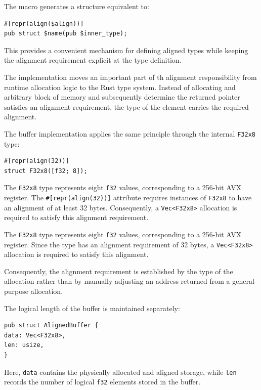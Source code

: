 The macro generates a structure equivalent to:

\begin{lstlisting}[style=rustblock]
#[repr(align($align))]
pub struct $name(pub $inner_type);
\end{lstlisting}

This provides a convenient mechanism for defining aligned types while keeping the alignment requirement 
explicit at the type definition.

The implementation moves an important part of th alignment responsibility from runtime allocation logic to 
the Rust type system.
Instead of allocating and arbitrary block of memory and subsequently determine the returned pointer satisfies an 
alignment requirement, the type of the element carries the required alignment.

The buffer implementation applies the same principle through the internal \lstinline|F32x8| type:

\begin{lstlisting}[style=rustblock]
#[repr(align(32))]
struct F32x8([f32; 8]);
\end{lstlisting}

The \lstinline|F32x8| type represents eight \lstinline|f32| values, corresponding to a 256-bit AVX register. 
The \lstinline|#[repr(align(32))]| attribute requires instances of \lstinline|F32x8| to have an alignment of at 
least 32 bytes.
Consequently, a \lstinline|Vec<F32x8>| allocation is required to satisfy this alignment requirement.

The \lstinline|F32x8| type represents eight \lstinline|f32| values, corresponding to a 256-bit AVX register. 
Since the type has an alignment requirement of 32 bytes, a \lstinline|Vec<F32x8>| allocation is required
to satisfy this alignment.

Consequently, the alignment requirement is established by the type of the allocation rather than by manually 
adjusting an address returned from a general-purpose allocation.

The logical length of the buffer is maintained separately:

\begin{lstlisting}[style=rustblock]
pub struct AlignedBuffer {
data: Vec<F32x8>,
len: usize,
}
\end{lstlisting}

Here, \lstinline|data| contains the physically allocated and aligned storage, 
while \lstinline|len| records the number of logical \lstinline|f32| elements stored in the buffer.

